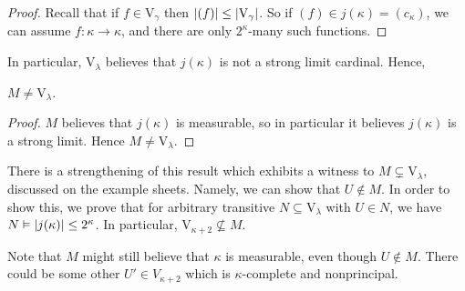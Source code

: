 \begin{proof}
    Recall that if \( f \in \mathrm{V}_\gamma \) then \( \abs{(f)} \leq \abs{\mathrm{V}_\gamma} \).
    So if \( (f) \in j(\kappa) = (c_\kappa) \), we can assume \( f : \kappa \to \kappa \), and there are only \( 2^\kappa \)-many such functions.
\end{proof}
In particular, \( \mathrm{V}_\lambda \) believes that \( j(\kappa) \) is not a strong limit cardinal.
Hence,
\begin{lemma}
    \( M \neq \mathrm{V}_\lambda \).
\end{lemma}
\begin{proof}
    \( M \) believes that \( j(\kappa) \) is measurable, so in particular it believes \( j(\kappa) \) is a strong limit.
    Hence \( M \neq \mathrm{V}_\lambda \).
\end{proof}
There is a strengthening of this result which exhibits a witness to \( M \subsetneq \mathrm{V}_\lambda \), discussed on the example sheets.
Namely, we can show that \( U \notin M \).
In order to show this, we prove that for arbitrary transitive \( N \subseteq \mathrm{V}_\lambda \) with \( U \in N \), we have \( N \vDash \abs{j(\kappa)} \leq 2^\kappa \).
In particular, \( \mathrm{V}_{\kappa + 2} \nsubseteq M \).

Note that \( M \) might still believe that \( \kappa \) is measurable, even though \( U \notin M \).
There could be some other \( U' \in V_{\kappa + 2} \) which is \( \kappa \)-complete and nonprincipal.

